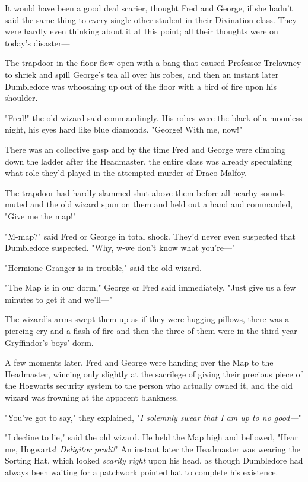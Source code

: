 It would have been a good deal scarier, thought Fred and George, if she hadn't 
said the same thing to every single other student in their Divination class. 
They were hardly even thinking about it at this point; all their thoughts were 
on today's disaster---

The trapdoor in the floor flew open with a bang that caused Professor Trelawney 
to shriek and spill George's tea all over his robes, and then an instant later 
Dumbledore was whooshing up out of the floor with a bird of fire upon his 
shoulder.

"Fred!" the old wizard said commandingly. His robes were the black of a 
moonless night, his eyes hard like blue diamonds. "George! With me, now!"

There was an collective gasp and by the time Fred and George were climbing down 
the ladder after the Headmaster, the entire class was already speculating what 
role they'd played in the attempted murder of Draco Malfoy.

The trapdoor had hardly slammed shut above them before all nearby sounds muted 
and the old wizard spun on them and held out a hand and commanded, "Give me the 
map!"

"M-map?" said Fred or George in total shock. They'd never even suspected that 
Dumbledore suspected. "Why, w-we don't know what you're---"

"Hermione Granger is in trouble," said the old wizard.

"The Map is in our dorm," George or Fred said immediately. "Just give us a few 
minutes to get it and we'll---"

The wizard's arms swept them up as if they were hugging-pillows, there was a 
piercing cry and a flash of fire and then the three of them were in the 
third-year Gryffindor's boys' dorm.

A few moments later, Fred and George were handing over the Map to the 
Headmaster, wincing only slightly at the sacrilege of giving their precious 
piece of the Hogwarts security system to the person who actually owned it, and 
the old wizard was frowning at the apparent blankness.

"You've got to say," they explained, "\emph{I solemnly swear that I am up to no 
good---}"

"I decline to lie," said the old wizard. He held the Map high and bellowed, 
"Hear me, Hogwarts! \emph{Deligitor prodi!}" An instant later the Headmaster 
was wearing the Sorting Hat, which looked \emph{scarily right} upon his head, 
as though Dumbledore had always been waiting for a patchwork pointed hat to 
complete his existence.

